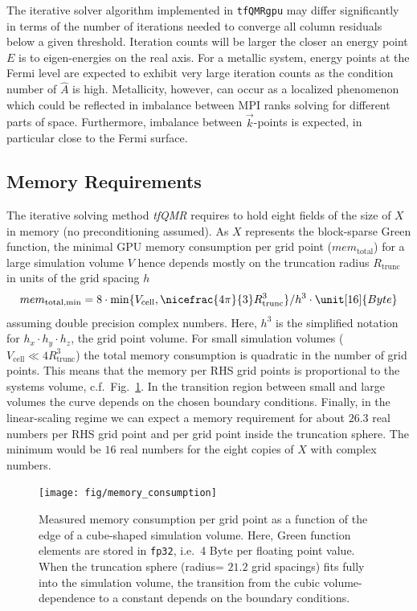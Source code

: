 \documentclass[oribibl]{llncs}
\newcommand{\um}[1]{_{\mathrm{#1}}}
\newcommand{\ttt}[1]{\texttt{#1}}
\begin{document}
\noindent
The iterative solver algorithm implemented in \ttt{tfQMRgpu} may differ significantly in terms of the number of iterations needed to converge all column residuals below a given threshold. Iteration counts will be larger the closer an energy point $E$ is to eigen-energies on the real axis. For a metallic system, energy points at the Fermi level are expected to exhibit very large iteration counts as the condition number of $\hat A$ is high. Metallicity, however, can occur as a localized phenomenon which could be reflected in imbalance between \ac{MPI} ranks solving for different parts of space.
Furthermore, imbalance between $\vec k$-points is expected, in particular close to the Fermi surface.


\subsection{Memory Requirements}\label{sec:memory-requirements}
%
The iterative solving method \emph{tfQMR} requires to hold eight fields of the size of $X$ in memory (no preconditioning assumed).
As $X$ represents the block-sparse Green function, the minimal \ac{GPU} memory consumption per grid point ($mem\um{total}$) for a large simulation volume $V$ hence depends mostly on the truncation radius $R\um{trunc}$ in units of the grid spacing $h$
\begin{equation} 
	mem\um{total,min} = 8 \cdot \min\{V\um{cell}, \nicefrac{4\pi}{3} R^3\um{trunc} \}/h^3 \cdot \unit[16]{Byte} 	
	\label{eqn:memory}
\end{equation}
assuming double precision complex numbers. Here, $h^3$ is the simplified notation for $h_x \cdot h_y \cdot h_z$, the grid point volume.
For small simulation volumes ($V\um{cell} \ll 4R\um{trunc}^3$) the total memory consumption is quadratic in the number of grid points. This means that the memory per \ac{RHS} grid points is proportional to the systems volume, c.f.~Fig.~\ref{fig:memory-consumption}. In the transition region between small and large volumes the curve depends on the chosen boundary conditions.
Finally, in the linear-scaling regime we can expect a memory requirement for about $26.3$ real numbers per \ac{RHS} grid point and per grid point inside the truncation sphere. The minimum would be $16$ real numbers for the eight copies of $X$ with complex numbers.

\begin{figure}[t]
	\centering
	\texttt{[image: fig/memory\_consumption]}
	\label{fig:memory-consumption}
	\caption{Measured memory consumption per grid point as a function of the edge of a cube-shaped simulation volume.
	Here, Green function elements are stored in \ttt{fp32}, i.e.~4 Byte per floating point value.
	When the truncation sphere (radius= $21.2$ grid spacings) fits fully into the simulation volume, 
	the transition from the cubic volume-dependence to a constant depends on the boundary conditions.}
\end{figure}
\end{document}
